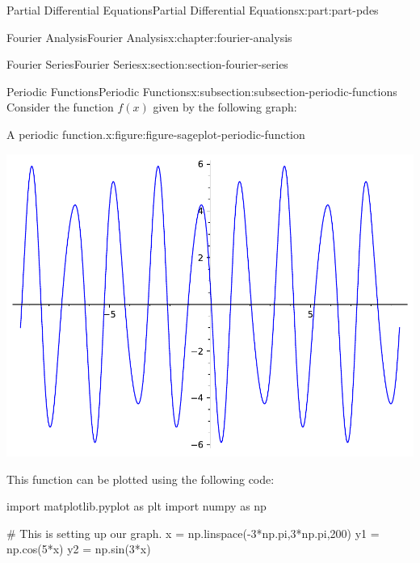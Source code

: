\documentclass[oneside,10pt,]{book}
\numberwithin{equation}{part}
\begin{document}
\begin{partptx}{Partial Differential Equations}{}{Partial Differential Equations}{}{}{x:part:part-pdes}
\begin{chapterptx}{Fourier Analysis}{}{Fourier Analysis}{}{}{x:chapter:fourier-analysis}
\begin{sectionptx}{Fourier Series}{}{Fourier Series}{}{}{x:section:section-fourier-series}
%
%
\typeout{************************************************}
\typeout{************************************************}
%
\begin{subsectionptx}{Periodic Functions}{}{Periodic Functions}{}{}{x:subsection:subsection-periodic-functions}
Consider the function \(f(x)\) given by the following graph:%
\begin{figureptx}{A periodic function.}{x:figure:figure-sageplot-periodic-function}{}%
\begin{image}{0}{1}{0}%
\includegraphics[width=\linewidth]{generated/sageplot/image-sageplot-periodic-function.pdf}%
\end{image}%
\tcblower
\end{figureptx}%
This function can be plotted using the following code:%
\begin{sageinput}
import matplotlib.pyplot as plt
import numpy as np

# This is setting up our graph.
x = np.linspace(-3*np.pi,3*np.pi,200)
y1 = np.cos(5*x)
y2 = np.sin(3*x)


\end{sageinput}
\end{subsectionptx}
\end{sectionptx}
\end{chapterptx}
\end{partptx}
\end{document}
